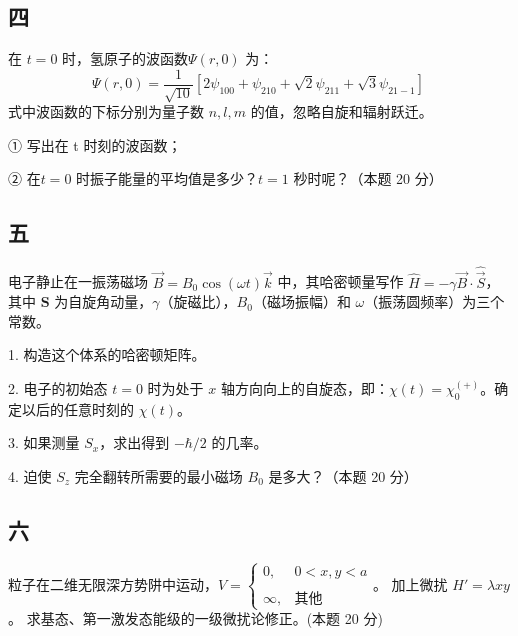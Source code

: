 \subsection{四}
在 $t = 0 $ 时，氢原子的波函数$\Psi(r, 0)$ 为：$$\Psi(r, 0) = \frac{1}{\sqrt{10}} \left[ 2\psi_{100} + \psi_{210} + \sqrt{2}\psi_{211} + \sqrt{3}\psi_{21-1} \right]~$$
式中波函数的下标分别为量子数 $ n, l, m $ 的值，忽略自旋和辐射跃迁。

①  写出在 t 时刻的波函数；

② 在$ t = 0$ 时振子能量的平均值是多少？$t = 1$ 秒时呢？（本题 20 分）

\subsection{五}
电子静止在一振荡磁场 $\vec{B} = B_0 \cos(\omega t) {\vec{k}}$ 中，其哈密顿量写作 $\hat{H} = - \gamma \vec{B} \cdot \hat{\vec S}$，其中 $\mathbf{S}$ 为自旋角动量，$\gamma$（旋磁比），$B_0$（磁场振幅）和 $\omega$（振荡圆频率）为三个常数。

1. 构造这个体系的哈密顿矩阵。

2. 电子的初始态 $t = 0$ 时为处于 $x$ 轴方向向上的自旋态，即：$\chi (t) = \chi_{0}^{(+)}$。确定以后的任意时刻的 $\chi (t)$。

3. 如果测量 $S_x$，求出得到 $- \hbar / 2$ 的几率。

4. 迫使 $S_z$ 完全翻转所需要的最小磁场 $B_0$ 是多大？（本题 20 分）

\subsection{六}
粒子在二维无限深方势阱中运动，$ V = \begin{cases} 0, & 0 < x, y < a \\\\ \infty, & \text{其他}\end{cases} $。 加上微扰 $ H' = \lambda xy $。 求基态、第一激发态能级的一级微扰论修正。(本题 20 分)
